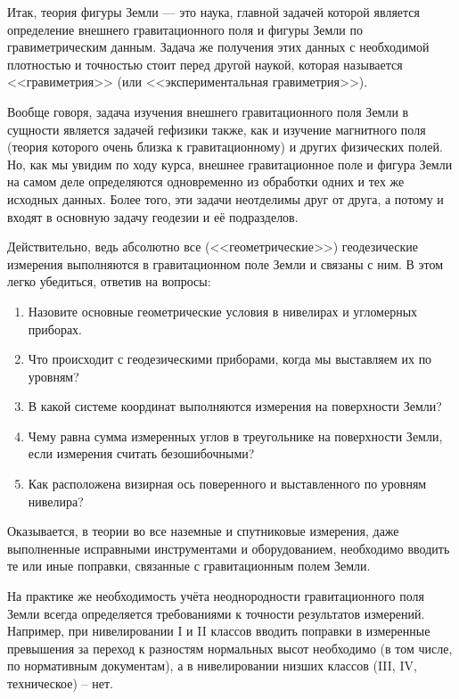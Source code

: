 \documentclass[11pt, a4paper]{article}
\theoremstyle{plain}
\theoremstyle{definition}
\theoremstyle{remark}
\begin{document}
Итак, теория фигуры Земли --- это наука, главной задачей которой является определение внешнего
гравитационного поля и фигуры Земли по гравиметрическим данным. Задача же получения этих данных с
необходимой плотностью и точностью стоит перед другой наукой, 
которая называется <<гравиметрия>> (или <<экспериментальная гравиметрия>>).

Вообще говоря, задача изучения внешнего гравитационного поля Земли в сущности является задачей
гефизики также, как и изучение магнитного поля (теория которого очень близка к гравитационному) 
и других физических полей. Но, как мы увидим по ходу курса, внешнее гравитационное поле и фигура
Земли на самом деле определяются одновременно из обработки одних и тех же исходных данных. Более
того, эти задачи неотделимы друг от друга, а потому и входят в основную задачу геодезии и её подразделов\cite{Pellinen1978}.

Действительно, ведь абсолютно все (<<геометрические>>) геодезические измерения выполняются в гравитационном поле 
Земли и связаны с ним. В этом легко убедиться, ответив на вопросы:
\begin{enumerate}
    \item Назовите основные геометрические условия в нивелирах и угломерных приборах.
    \item Что происходит с геодезическими приборами, когда мы выставляем их по уровням? 
    \item В какой системе координат выполняются измерения на поверхности Земли?
    \item Чему равна сумма измеренных углов в треугольнике на поверхности Земли, если измерения считать безошибочными?
    \item Как расположена визирная ось поверенного и выставленного по уровням нивелира?
\end{enumerate}
Оказывается, в теории во все наземные и спутниковые измерения, даже выполненные исправными
инструментами и оборудованием, необходимо вводить те или иные поправки, связанные с гравитационным полем Земли.

На практике же необходимость учёта неоднородности гравитационного поля Земли всегда определяется требованиями к
точности результатов измерений. Например, при нивелировании I и II классов вводить поправки в измеренные
превышения за переход к разностям нормальных высот необходимо (в том числе, по нормативным документам), а в 
нивелировании низших классов (III, IV, техническое) -- нет.
\end{document}
